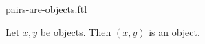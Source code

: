 \documentclass{stex}
\begin{document}
\begin{smodule}{pairs-are-objects.ftl}
  \begin{flemma*}
    Let $x, y$ be objects.
    Then $(x,y)$ is an object.
  \end{flemma*}
\end{smodule}
\end{document}
